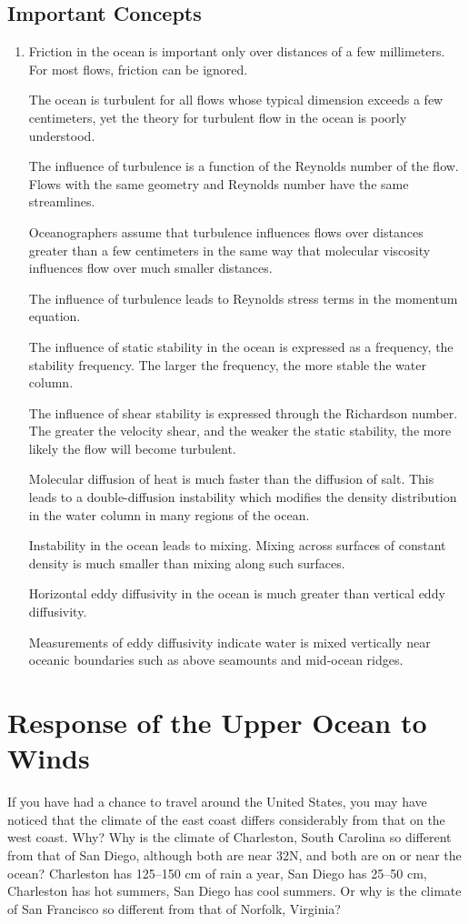 \section{Important Concepts}
\begin{enumerate}
\item Friction in the ocean is important only over distances of a few
millimeters. For most flows, friction can be ignored.

\vitem The ocean is turbulent for all flows whose typical dimension
exceeds a few centimeters, yet the theory for turbulent flow in the
ocean is poorly understood.

\vitem The influence of turbulence
is a function of the Reynolds number of the flow. Flows with the same
geometry and Reynolds number have the same streamlines.

\vitem Oceanographers assume that turbulence influences flows over
distances greater than a few centimeters in the same way that
molecular viscosity influences flow over much smaller distances.

\vitem The influence of turbulence leads to Reynolds stress terms in
the momentum equation.

\vitem The influence of static stability in the ocean is expressed as
a frequency, the stability frequency. The
larger the frequency, the more stable the water column.

\vitem The influence of shear stability is expressed through the
Richardson number. The greater the velocity shear, and the weaker the
static stability, the more likely the flow will become turbulent.

\vitem Molecular diffusion of heat is much faster than the diffusion
of salt.  This leads to a double-diffusion instability which modifies
the density distribution in the water column in many regions of the
ocean.

\vitem Instability in the ocean leads to mixing. Mixing across
surfaces of constant density is much smaller than mixing along such
surfaces.

\vitem Horizontal eddy diffusivity in the ocean is much greater than
vertical eddy diffusivity.

\vitem Measurements of eddy diffusivity indicate water is mixed
vertically near oceanic boundaries such as above seamounts and
mid-ocean ridges.
\end{enumerate}


\chapter{Response of the Upper Ocean to Winds}
If you have had a chance to travel around the United States, you may
have noticed that the climate of the east coast differs considerably
from that on the west coast. Why? Why is the climate of Charleston,
South Carolina so different from that of San Diego, although both are
near 32\degrees N, and both are on or near the ocean? Charleston has
125--150 cm of rain a year, San Diego has 25--50 cm, Charleston has
hot summers, San Diego has cool summers. Or why is the climate of San
Francisco so different from that of Norfolk, Virginia?

